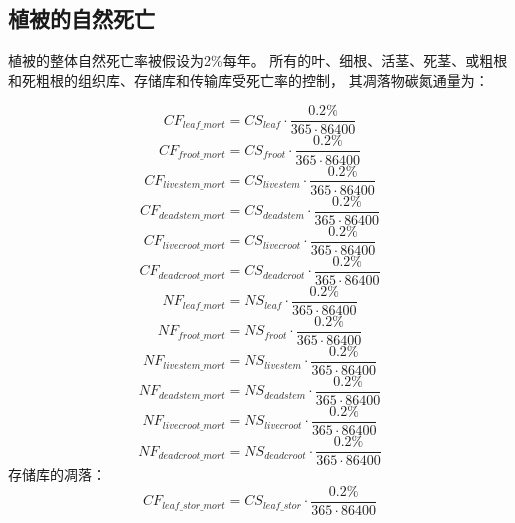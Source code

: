 \subsection{植被的自然死亡}\label{植被的自然死亡}
植被的整体自然死亡率被假设为2\%每年。
所有的叶、细根、活茎、死茎、或粗根和死粗根的组织库、存储库和传输库受死亡率的控制，
其凋落物碳氮通量为： 


\begin{equation}
  CF_{leaf\_{mort}}=CS_{leaf}\cdot \frac{0.2\%}{365\cdot 86400}
\end{equation}
\begin{equation}
  CF_{froot\_mort}=CS_{froot}\cdot \frac{0.2\%}{365\cdot 86400}
\end{equation}
\begin{equation}
  CF_{livestem\_mort}=CS_{livestem}\cdot \frac{0.2\%}{365\cdot 86400}
\end{equation}
\begin{equation}
  CF_{deadstem\_mort}=CS_{deadstem}\cdot \frac{0.2\%}{365\cdot 86400}
\end{equation}
\begin{equation}
  CF_{livecroot\_mort}=CS_{livecroot}\cdot \frac{0.2\%}{365\cdot 86400}
\end{equation}
\begin{equation}
  CF_{deadcroot\_mort}=CS_{deadcroot}\cdot \frac{0.2\%}{365\cdot 86400}
\end{equation}
\begin{equation}
  NF_{leaf\_{mort}}=NS_{leaf}\cdot \frac{0.2\%}{365\cdot 86400}
\end{equation}
\begin{equation}
  NF_{froot\_mort}=NS_{froot}\cdot \frac{0.2\%}{365\cdot 86400}
\end{equation}
\begin{equation}
  NF_{livestem\_mort}=NS_{livestem}\cdot \frac{0.2\%}{365\cdot 86400}
\end{equation}
\begin{equation}
  NF_{deadstem\_mort}=NS_{deadstem}\cdot \frac{0.2\%}{365\cdot 86400}
\end{equation}
\begin{equation}
  NF_{livecroot\_mort}=NS_{livecroot}\cdot \frac{0.2\%}{365\cdot 86400}
\end{equation}
\begin{equation}
  NF_{deadcroot\_mort}=NS_{deadcroot}\cdot \frac{0.2\%}{365\cdot 86400}
\end{equation}
存储库的凋落：
\begin{equation}
  CF_{leaf\_{{stor}\_{mort}}}=CS_{leaf\_{stor}}\cdot \frac{0.2\%}{365\cdot 86400}
\end{equation}
